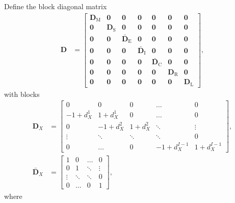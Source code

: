 \documentclass[12pt]{article}
\newcommand{\mat}[1]{\mathbf{#1}}
\begin{document}
Define the block diagonal matrix
\begin{align}
  \mat{D} &=
  \begin{bmatrix}
    \mat{D}_{\mathrm{M}} & \mat{0} & \mat{0} &
    \mat{0} & \mat{0} & \mat{0} & \mat{0}
    \\
    \mat{0} & \mat{D}_{\mathrm{S}} & \mat{0} &
    \mat{0} & \mat{0} & \mat{0} & \mat{0}
    \\
    \mat{0} & \mat{0} & \bar{\mat{D}}_{\mathrm{E}} &
    \mat{0} & \mat{0} & \mat{0} & \mat{0}
    \\
    \mat{0} & \mat{0} & \mat{0} &
    \bar{\mat{D}}_{\mathrm{I}} & \mat{0} & \mat{0} & \mat{0}
    \\
    \mat{0} & \mat{0} & \mat{0} & \mat{0} &
    \bar{\mat{D}}_{\mathrm{C}} & \mat{0} & \mat{0}
    \\
    \mat{0} & \mat{0} & \mat{0} & \mat{0} &
    \mat{0} & \mat{D}_{\mathrm{R}} & \mat{0}
    \\
    \mat{0} & \mat{0} & \mat{0} & \mat{0} &
    \mat{0} & \mat{0} & \mat{D}_{\mathrm{L}}
  \end{bmatrix},
\end{align}
with blocks
\begin{subequations}
  \begin{align}
    \mat{D}_X &=
    \begin{bmatrix}
      0 & 0 & 0 & \hdots & 0
      \\
      - 1 + d_X^1 & 1 + d_X^1 & 0 & \hdots & 0
      \\
      0 & - 1 + d_X^2 & 1 + d_X^2 & \ddots & \vdots
      \\
      \vdots & \ddots & \ddots & \ddots & 0
      \\
      0 & \hdots & 0 & - 1 + d_X^{I - 1} & 1 + d_X^{I - 1}
    \end{bmatrix},
    \\
    \bar{\mat{D}}_X &=
    \begin{bmatrix}
      1 & 0 & \hdots & 0 \\
      0 & 1 & \ddots & \vdots \\
      \vdots & \ddots & \ddots & 0 \\
      0 & \hdots & 0 & 1
    \end{bmatrix},
  \end{align}
\end{subequations}
where
\end{document}
